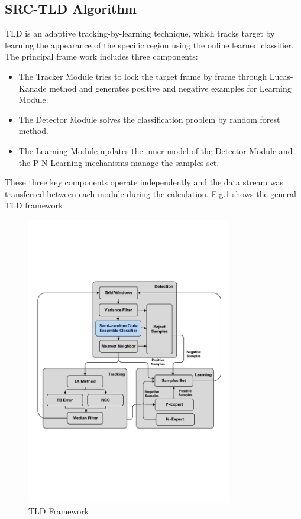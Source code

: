 \subsection{SRC-TLD Algorithm}
TLD\cite{kalal2012tracking} is an adaptive tracking-by-learning technique, which tracks target by learning the appearance of the specific region using the online learned classifier. The principal frame work includes three components: 
\begin{itemize}
	\item The Tracker Module tries to lock the target frame by frame through Lucas-Kanade method and generates positive and negative examples for Learning Module.
	
	\item The Detector Module solves the classification problem by random forest method.
		
	\item The Learning Module updates the inner model of the Detector Module and the P-N Learning mechanisms manage the samples set.
\end{itemize}
These three key components operate independently and the data stream was transferred between each module during the calculation. Fig.\ref{fig:sci03_tld_framework} shows the general TLD framework.

\begin{figure}[!th]
	\centering
	\includegraphics[width=0.8\textwidth]{Figs/sci03_tld_framework.pdf}	
	\caption{TLD Framework}
	\label{fig:sci03_tld_framework}
\end{figure}

